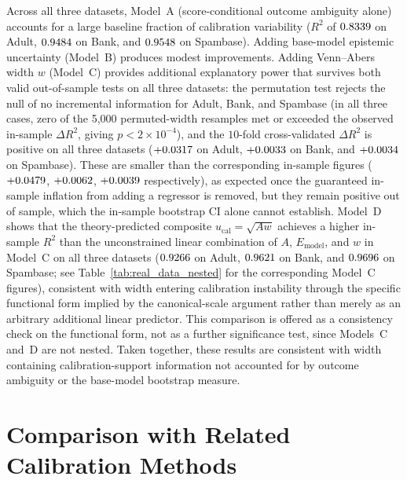 \documentclass[11pt]{article}
\begin{document}
	

	Across all three datasets, Model~A (score-conditional outcome ambiguity alone) accounts for a large baseline fraction of calibration variability ($R^2$ of $0.8339{}$ on Adult, $0.9484{}$ on Bank, and $0.9548{}$ on Spambase). Adding base-model epistemic uncertainty (Model~B) produces modest improvements. Adding Venn--Abers width $w$ (Model~C) provides additional explanatory power that survives both valid out-of-sample tests on all three datasets: the permutation test rejects the null of no incremental information for Adult, Bank, and Spambase (in all three cases, zero of the 5{,}000 permuted-width resamples met or exceeded the observed in-sample $\Delta R^2$, giving $p<2\times10^{-4}$), and the $10$-fold cross-validated $\Delta R^2$ is positive on all three datasets ($+0.0317{}$ on Adult, $+0.0033{}$ on Bank, and $+0.0034{}$ on Spambase). These are smaller than the corresponding in-sample figures ($+0.0479{}$, $+0.0062{}$, $+0.0039{}$ respectively), as expected once the guaranteed in-sample inflation from adding a regressor is removed, but they remain positive out of sample, which the in-sample bootstrap CI alone cannot establish. Model~D shows that the theory-predicted composite $u_{\mathrm{cal}} = \sqrt{Aw}$ achieves a higher in-sample $R^2$ than the unconstrained linear combination of $A$, $E_{\mathrm{model}}$, and $w$ in Model~C on all three datasets ($0.9266{}$ on Adult, $0.9621{}$ on Bank, and $0.9696{}$ on Spambase; see Table~\ref{tab:real_data_nested} for the corresponding Model~C figures), consistent with width entering calibration instability through the specific functional form implied by the canonical-scale argument rather than merely as an arbitrary additional linear predictor. This comparison is offered as a consistency check on the functional form, not as a further significance test, since Models~C and~D are not nested. Taken together, these results are consistent with width containing calibration-support information not accounted for by outcome ambiguity or the base-model bootstrap measure.

	\section{Comparison with Related Calibration Methods}
	\label{sec:alternatives}
\end{document}
